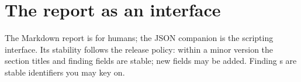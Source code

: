 \section{The report as an interface}

The Markdown report is for humans; the JSON companion is the scripting
interface. Its stability follows the release policy: within a minor version
the section titles and finding fields are stable; new fields may be added.
Finding s are stable identifiers you may key on.
